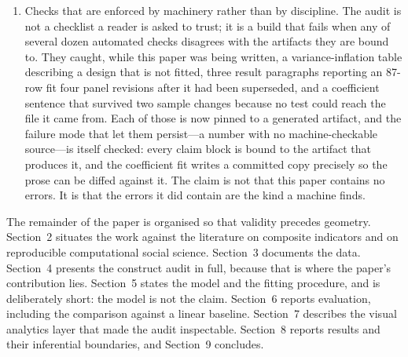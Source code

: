 \documentclass[11pt]{article}
\begin{document}
\begin{enumerate}
\item Checks that are enforced by machinery rather than by discipline. The audit is not a checklist a reader is asked to trust; it is a build that fails when any of several dozen automated checks disagrees with the artifacts they are bound to. They caught, while this paper was being written, a variance-inflation table describing a design that is not fitted, three result paragraphs reporting an \num{87}-row fit four panel revisions after it had been superseded, and a coefficient sentence that survived two sample changes because no test could reach the file it came from. Each of those is now pinned to a generated artifact, and the failure mode that let them persist---a number with no machine-checkable source---is itself checked: every claim block is bound to the artifact that produces it, and the coefficient fit writes a committed copy precisely so the prose can be diffed against it. The claim is not that this paper contains no errors. It is that the errors it did contain are the kind a machine finds.
\end{enumerate}

The remainder of the paper is organised so that validity precedes geometry. Section~2 situates the work against the literature on composite indicators and on reproducible computational social science. Section~3 documents the data. Section~4 presents the construct audit in full, because that is where the paper's contribution lies. Section~5 states the model and the fitting procedure, and is deliberately short: the model is not the claim. Section~6 reports evaluation, including the comparison against a linear baseline. Section~7 describes the visual analytics layer that made the audit inspectable. Section~8 reports results and their inferential boundaries, and Section~9 concludes.
\end{document}
